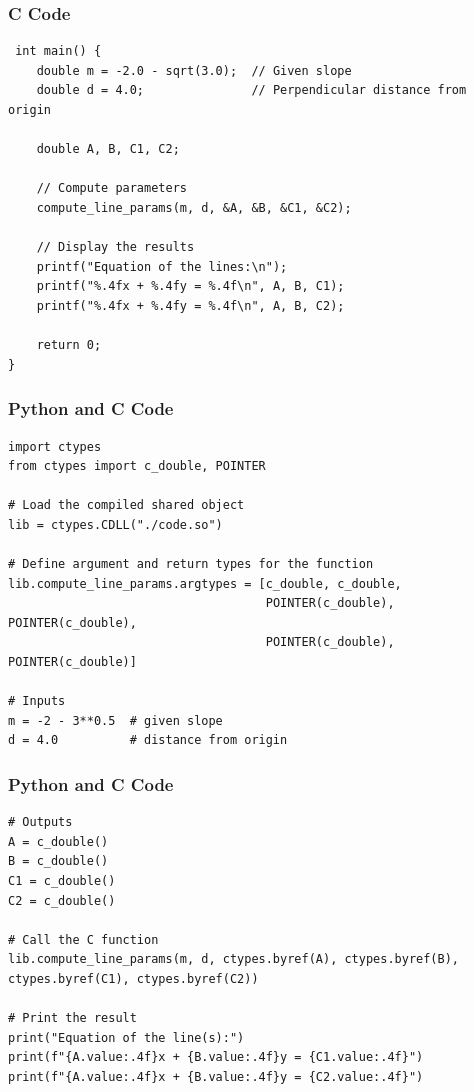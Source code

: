 \documentclass{beamer}
\begin{document}
\begin{frame}[fragile]
\frametitle{C Code}
\begin{lstlisting}
 int main() {
    double m = -2.0 - sqrt(3.0);  // Given slope
    double d = 4.0;               // Perpendicular distance from origin

    double A, B, C1, C2;

    // Compute parameters
    compute_line_params(m, d, &A, &B, &C1, &C2);

    // Display the results
    printf("Equation of the lines:\n");
    printf("%.4fx + %.4fy = %.4f\n", A, B, C1);
    printf("%.4fx + %.4fy = %.4f\n", A, B, C2);

    return 0;
}

\end{lstlisting}
\end{frame}

\begin{frame}[fragile]
\frametitle{Python and C Code}

\begin{lstlisting}
import ctypes
from ctypes import c_double, POINTER

# Load the compiled shared object
lib = ctypes.CDLL("./code.so")

# Define argument and return types for the function
lib.compute_line_params.argtypes = [c_double, c_double,
                                    POINTER(c_double), POINTER(c_double),
                                    POINTER(c_double), POINTER(c_double)]

# Inputs
m = -2 - 3**0.5  # given slope
d = 4.0          # distance from origin

\end{lstlisting}

\end{frame}
\begin{frame}[fragile]
\frametitle{Python and C Code}

\begin{lstlisting}
# Outputs
A = c_double()
B = c_double()
C1 = c_double()
C2 = c_double()

# Call the C function
lib.compute_line_params(m, d, ctypes.byref(A), ctypes.byref(B), ctypes.byref(C1), ctypes.byref(C2))

# Print the result
print("Equation of the line(s):")
print(f"{A.value:.4f}x + {B.value:.4f}y = {C1.value:.4f}")
print(f"{A.value:.4f}x + {B.value:.4f}y = {C2.value:.4f}")


\end{lstlisting}

\end{frame}
\end{document}
